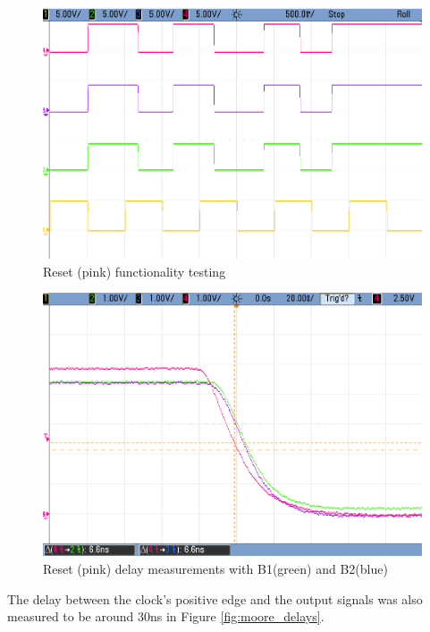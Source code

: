 \begin{figure}[ht]
    \begin{center}
        \includegraphics[width=0.75\linewidth]{images/e3e1_1_4nreset.png}
        \caption{Reset (pink) functionality testing}
        \label{fig:moore_nres}
    \end{center}
\end{figure}

\begin{figure}[ht]
    \begin{center}
        \includegraphics[width=0.75\linewidth]{images/e3e1_nreset_delay.png}
        \caption{Reset (pink) delay measurements with B1(green) and B2(blue)}
        \label{fig:moore_nres_delay}
    \end{center}
\end{figure}

The delay between the clock's positive edge and the output signals was also measured to be around 30ns in Figure \ref{fig:moore_delays}.

